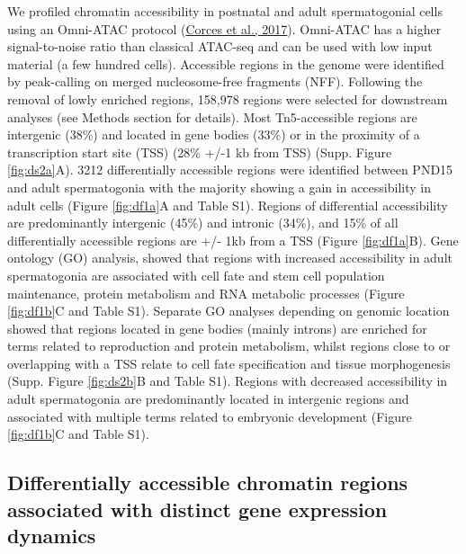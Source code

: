 \documentclass[12pt,twoside]{reedthesis}
\begin{document}
We profiled chromatin accessibility in postnatal and adult
spermatogonial cells using an Omni-ATAC protocol (\protect\hyperlink{ref-corces2017}{Corces et al., 2017}).
Omni-ATAC has a higher signal-to-noise ratio than classical ATAC-seq and
can be used with low input material (a few hundred cells). Accessible
regions in the genome were identified by peak-calling on merged
nucleosome-free fragments (NFF). Following the removal of lowly enriched
regions, 158,978 regions were selected for downstream analyses (see
Methods section for details). Most Tn5-accessible regions are intergenic
(38\%) and located in gene bodies (33\%) or in the proximity of a
transcription start site (TSS) (28\% +/-1 kb from TSS) (Supp. Figure \ref{fig:ds2a}A). 3212
differentially accessible regions were identified between PND15 and
adult spermatogonia with the majority showing a gain in accessibility in
adult cells (Figure \ref{fig:df1a}A and Table S1). Regions of differential
accessibility are predominantly intergenic (45\%) and intronic (34\%), and
15\% of all differentially accessible regions are +/- 1kb from a TSS
(Figure \ref{fig:df1a}B). Gene ontology (GO) analysis, showed that regions with
increased accessibility in adult spermatogonia are associated with cell
fate and stem cell population maintenance, protein metabolism and RNA
metabolic processes (Figure \ref{fig:df1b}C and Table S1). Separate GO analyses
depending on genomic location showed that regions located in gene bodies
(mainly introns) are enriched for terms related to reproduction and
protein metabolism, whilst regions close to or overlapping with a TSS
relate to cell fate specification and tissue morphogenesis (Supp. Figure \ref{fig:ds2b}B and
Table S1). Regions with decreased accessibility in adult spermatogonia
are predominantly located in intergenic regions and associated with
multiple terms related to embryonic development (Figure \ref{fig:df1b}C and Table S1).

\hypertarget{differentially-accessible-chromatin-regions-associated-with-distinct-gene-expression-dynamics}{%
\subsection{Differentially accessible chromatin regions associated with distinct gene expression dynamics}\label{differentially-accessible-chromatin-regions-associated-with-distinct-gene-expression-dynamics}}
\end{document}
